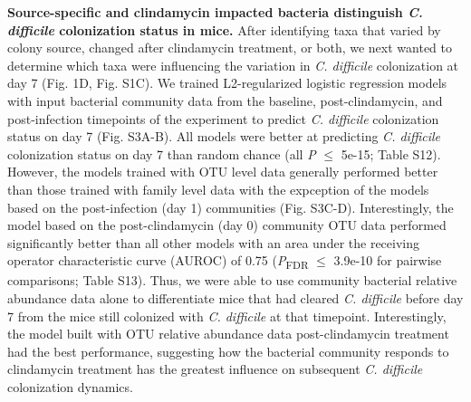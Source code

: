 \documentclass[11pt,]{article}
\begin{document}
\textbf{Source-specific and clindamycin impacted bacteria distinguish
\emph{C. difficile} colonization status in mice.} After identifying taxa
that varied by colony source, changed after clindamycin treatment, or
both, we next wanted to determine which taxa were influencing the
variation in \emph{C. difficile} colonization at day 7 (Fig. 1D, Fig.
S1C). We trained L2-regularized logistic regression models with input
bacterial community data from the baseline, post-clindamycin, and
post-infection timepoints of the experiment to predict \emph{C.
difficile} colonization status on day 7 (Fig. S3A-B). All models were
better at predicting \emph{C. difficile} colonization status on day 7
than random chance (all \emph{P} \(\le\) 5e-15; Table S12). However, the
models trained with OTU level data generally performed better than those
trained with family level data with the expception of the models based
on the post-infection (day 1) communities (Fig. S3C-D). Interestingly,
the model based on the post-clindamycin (day 0) community OTU data
performed significantly better than all other models with an area under
the receiving operator characteristic curve (AUROC) of 0.75
(\emph{P}\textsubscript{FDR} \(\le\) 3.9e-10 for pairwise comparisons;
Table S13). Thus, we were able to use community bacterial relative
abundance data alone to differentiate mice that had cleared \emph{C.
difficile} before day 7 from the mice still colonized with \emph{C.
difficile} at that timepoint. Interestingly, the model built with OTU
relative abundance data post-clindamycin treatment had the best
performance, suggesting how the bacterial community responds to
clindamycin treatment has the greatest influence on subsequent \emph{C.
difficile} colonization dynamics.
\end{document}
